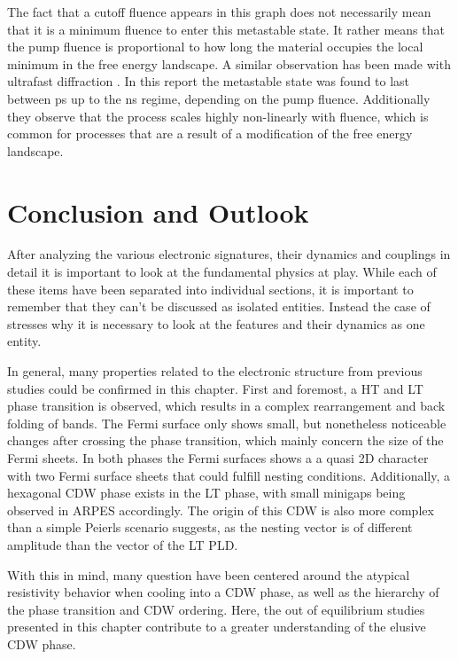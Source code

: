 The fact that a cutoff fluence appears in this graph does not necessarily mean that it is a minimum fluence to enter this metastable state.
It rather means that the pump fluence is proportional to how long the material occupies the local minimum in the free energy landscape.
A similar observation has been made with ultrafast diffraction \cite{domrose_femtosecond_2024}.
In this report the metastable state was found to last between \unit{\pico\second} up to the \unit{\nano\second} regime, depending on the pump fluence.
Additionally they observe that the process scales highly non-linearly with fluence, which is common for processes that are a result of a modification of the free energy landscape.

\section{Conclusion and Outlook}

After analyzing the various electronic signatures, their dynamics and couplings in detail it is important to look at the fundamental physics at play.
While each of these items have been separated into individual sections, it is important to remember that they can't be discussed as isolated entities.
Instead the case of  stresses why it is necessary to look at the features and their dynamics as one entity.

In general, many properties related to the electronic structure from previous studies could be confirmed in this chapter.
First and foremost, a HT and LT phase transition is observed, which results in a complex rearrangement and back folding of bands.
The Fermi surface only shows small, but nonetheless noticeable changes after crossing the phase transition, which mainly concern the size of the Fermi sheets.
In both phases the Fermi surfaces shows a a quasi 2D character with two Fermi surface sheets that could fulfill nesting conditions.
Additionally, a hexagonal CDW phase exists in the LT phase, with small minigaps being observed in ARPES accordingly.
The origin of  this CDW is also more complex than a simple Peierls scenario suggests, as the nesting vector is of different amplitude than the vector of the LT PLD.

With this in mind, many question have been centered around the atypical resistivity behavior when cooling into a CDW phase, as well as the hierarchy of the phase transition and CDW ordering.
Here, the out of equilibrium studies presented in this chapter contribute to a greater understanding of the elusive CDW phase. 

